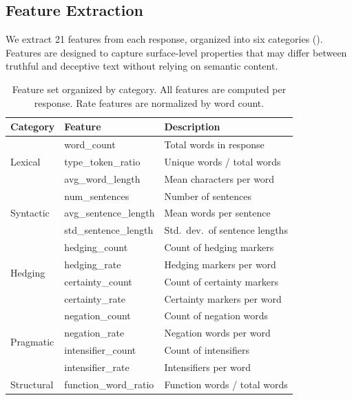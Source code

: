 \subsection{Feature Extraction}
\label{sec:features}

We extract 21 features from each response, organized into six categories ().
Features are designed to capture surface-level properties that may differ between truthful and deceptive text without relying on semantic content.

\begin{table}[t]
    \centering
    \caption{Feature set organized by category. All features are computed per response. Rate features are normalized by word count.}
    \begin{tabular}{@{}llp{5.5cm}@{}}
        \toprule
        \textbf{Category} & \textbf{Feature} & \textbf{Description} \\
        \midrule
        \multirow{3}{*}{Lexical} & word\_count & Total words in response \\
         & type\_token\_ratio & Unique words / total words \\
         & avg\_word\_length & Mean characters per word \\
        \midrule
        \multirow{3}{*}{Syntactic} & num\_sentences & Number of sentences \\
         & avg\_sentence\_length & Mean words per sentence \\
         & std\_sentence\_length & Std.\ dev.\ of sentence lengths \\
        \midrule
        \multirow{4}{*}{Hedging} & hedging\_count & Count of hedging markers \\
         & hedging\_rate & Hedging markers per word \\
         & certainty\_count & Count of certainty markers \\
         & certainty\_rate & Certainty markers per word \\
        \midrule
        \multirow{4}{*}{Pragmatic} & negation\_count & Count of negation words \\
         & negation\_rate & Negation words per word \\
         & intensifier\_count & Count of intensifiers \\
         & intensifier\_rate & Intensifiers per word \\
        \midrule
        \multirow{4}{*}{Structural} & function\_word\_ratio & Function words / total words \\

\end{tabular}
\end{table}
